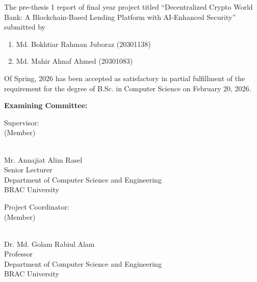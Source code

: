\documentclass[12pt,a4paper]{report}
\begin{document}
The pre-thesis 1 report of final year project titled ``Decentralized Crypto World Bank: A Blockchain-Based Lending Platform with AI-Enhanced Security'' submitted by

\begin{enumerate}
\item Md. Bokhtiar Rahman Juboraz (20301138)
\item Md. Mahir Ahnaf Ahmed (20301083)
\end{enumerate}

Of Spring, 2026 has been accepted as satisfactory in partial fulfillment of the requirement for the degree of B.Sc. in Computer Science on February 20, 2026.

\vspace{1cm}

\textbf{Examining Committee:}

\vspace{1.5cm}

\begin{flushleft}
Supervisor:\\
(Member)
\end{flushleft}

\begin{flushright}
\vspace{-0.5cm}
\hrulefill\\
Mr. Annajiat Alim Rasel\\
Senior Lecturer\\
Department of Computer Science and Engineering\\
BRAC University
\end{flushright}

\vspace{1.5cm}

\begin{flushleft}
Project Coordinator:\\
(Member)
\end{flushleft}

\begin{flushright}
\vspace{-0.5cm}
\hrulefill\\
Dr. Md. Golam Rabiul Alam\\
Professor\\
Department of Computer Science and Engineering\\
BRAC University
\end{flushright}

\newpage
\thispagestyle{empty}

\null\vfill
\end{document}
